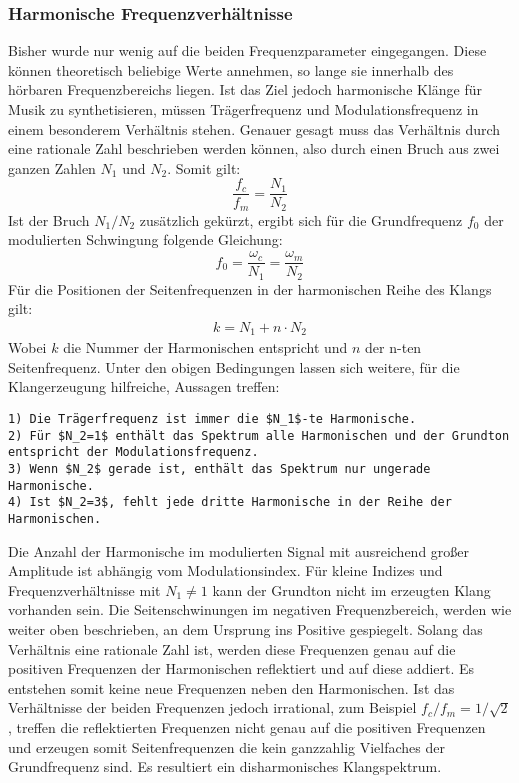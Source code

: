 \subsubsection{Harmonische Frequenzverhältnisse}
Bisher wurde nur wenig auf die beiden Frequenzparameter eingegangen. Diese können theoretisch beliebige Werte annehmen, so lange sie innerhalb des hörbaren Frequenzbereichs liegen. Ist das Ziel jedoch harmonische Klänge für Musik zu synthetisieren, müssen Trägerfrequenz und Modulationsfrequenz in einem besonderem Verhältnis stehen. Genauer gesagt muss das Verhältnis durch eine rationale Zahl beschrieben werden können, also durch einen Bruch aus zwei ganzen Zahlen $N_1$ und $N_2$. Somit gilt:
\begin{equation*}
\frac{f_c}{f_m}=\frac{N_1}{N_2}
\end{equation*}
Ist der Bruch $N_1/N_2$ zusätzlich gekürzt, ergibt sich für die Grundfrequenz $f_0$ der modulierten Schwingung folgende Gleichung:
\begin{equation*}
f_0=\frac{\omega_c}{N_1}=\frac{\omega_m}{N_2}
\end{equation*}
Für die Positionen der Seitenfrequenzen in der harmonischen Reihe des Klangs gilt:
\begin{align}
k=N_1+n\cdot N_2
\end{align}
Wobei $k$ die Nummer der Harmonischen entspricht und $n$ der n-ten Seitenfrequenz. Unter den obigen Bedingungen lassen sich weitere, für die Klangerzeugung hilfreiche, Aussagen treffen: \cite{chowningPaper}
\begin{lstlisting}[mathescape]
1) Die Trägerfrequenz ist immer die $N_1$-te Harmonische.
2) Für $N_2=1$ enthält das Spektrum alle Harmonischen und der Grundton entspricht der Modulationsfrequenz.
3) Wenn $N_2$ gerade ist, enthält das Spektrum nur ungerade Harmonische.
4) Ist $N_2=3$, fehlt jede dritte Harmonische in der Reihe der Harmonischen.
\end{lstlisting}
Die Anzahl der Harmonische im modulierten Signal mit ausreichend großer Amplitude ist abhängig vom Modulationsindex. Für kleine Indizes und Frequenzverhältnisse mit $N_1\neq1$ kann der Grundton nicht im erzeugten Klang vorhanden sein. Die Seitenschwinungen im negativen Frequenzbereich, werden wie weiter oben beschrieben, an dem Ursprung ins Positive gespiegelt. Solang das Verhältnis eine rationale Zahl ist, werden diese Frequenzen genau auf die positiven Frequenzen der Harmonischen reflektiert und auf diese addiert.
Es entstehen somit keine neue Frequenzen neben den Harmonischen. Ist das Verhältnisse der beiden Frequenzen jedoch irrational, 
zum Beispiel $f_c/f_m=1/\sqrt{2}$, treffen die reflektierten Frequenzen nicht genau auf die positiven Frequenzen und erzeugen somit Seitenfrequenzen die kein ganzzahlig Vielfaches der Grundfrequenz sind. Es resultiert ein disharmonisches Klangspektrum.

